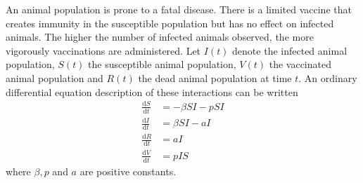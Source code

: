 \documentclass[answers]{exam}
\begin{document}
\begin{questions}



\question%
An animal population is prone to a fatal disease. There is a limited vaccine that creates immunity in the susceptible population but has no effect on infected animals. The higher the number of infected animals observed, the more vigorously vaccinations are administered. Let $I(t)$ denote the infected animal population, $S(t)$ the susceptible animal population, $V(t)$ the vaccinated animal population and $R(t)$ the dead animal population at time $t$. An ordinary differential equation description of these interactions can be written \begin{align*}
	\frac{\mathrm{d} S}{\mathrm{d} t} & =-\beta S I-p S I \\
	\frac{\mathrm{d} I}{\mathrm{d} t} & =\beta S I-a I \\
	\frac{\mathrm{d} R}{\mathrm{d} t} & =a I \\
	\frac{\mathrm{d} V}{\mathrm{d} t} & =p I S
\end{align*} where $\beta, p$ and $a$ are positive constants.
\end{questions}
\end{document}
